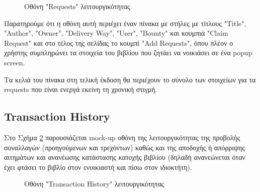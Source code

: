 \documentclass[12pt,a4paper]{article}
\begin{document}
\begin{figure}[H]
	\caption{Οθόνη "Requests" λειτουργικότητας}
	\label{Οθόνη "Requests" λειτουργικότητας}
\end{figure}

Παρατηρούμε ότι η οθόνη αυτή περιέχει έναν πίνακα με στήλες με τίτλους "Title", "Author", "Owner", "Delivery Way", "User", "Bounty" και κουμπιά "Claim Request" και στο τέλος της σελίδας το κουμπί "Add Requests", όπου πλέον ο χρήστης συμπληρώνει τα στοιχεία του βιβλίου που ζητάει να νοικιάσει σε ένα popup screen.

Τα κελιά του πίνακα στη τελική έκδοση θα περιέχουν το σύνολο των στοιχείων για τα requests που είναι ενεργά εκείνη τη χρονική στιγμή.

\subsection{Transaction History}

Στο Σχήμα \ref{Οθόνη "Transaction History" λειτουργικότητας} παρουσιάζεται mock-up οθόνη της λειτουργικότητας της προβολής συναλλαγών (προηγούμενων και τρεχόντων) καθώς και της αποδοχής ή απόρριψης αιτημάτων και ανανέωσης κατάστασης κατοχής βιβλίου (δηλαδή ανανεώνεται όταν έχει φτάσει το βιβλίο στον ενοικιαστή και πίσω στον ιδιοκτήτη).

\begin{figure}[H]
	\caption{Οθόνη "Transaction History" λειτουργικότητας}
	\label{Οθόνη "Transaction History" λειτουργικότητας}
\end{figure}
\end{document}
